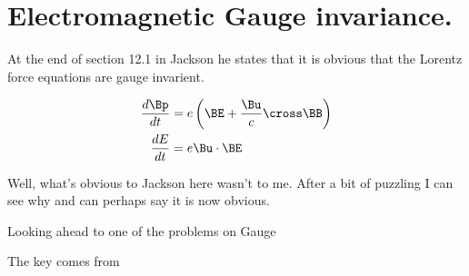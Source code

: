 

\chapter{Electromagnetic Gauge invariance.}
\label{chap:jackson12Dash9Gauge}
{}
\date{Sept 24, 2009}

\beginArtNoToc


At the end of section 12.1 in Jackson \cite{jackson1975cew} he states that it is obvious that the Lorentz force equations are gauge invarient.

\begin{align}\label{eqn:jacksonGaugeInv:foo1}
\frac{d \Bp}{dt} &= e \left( \BE + \frac{\Bu}{c} \cross \BB \right) \\
\frac{d E}{dt} &= e \Bu \cdot \BE 
\end{align}

Well, what's obvious to Jackson here wasn't to me.  After a bit of puzzling I can see why and can perhaps say it is now obvious.

Looking ahead to one of the problems on Gauge 


The key comes from 




\EndArticle
